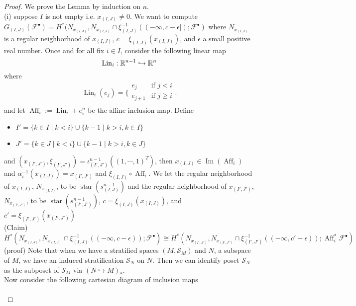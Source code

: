 \begin{proof}
We prove the Lemma by induction on $n$.\\
(i) suppose $I$ is not empty i.e. $x_{(I,J)} \neq 0$. We want to compute $G_{(I,J)}(\mathscr{F}^\bullet) = H^*(N_{x_{(I,J)}}, N_{x_{(I,J)}} \cap \xi_{(I,J)}^{-1}((-\infty,c-\epsilon]); \mathscr{F}^\bullet)$ where $N_{x_{(I,J)}}$ is a regular neighborhood of $x_{(I,J)}$, $c = \xi_{(I,J)}(x_{(I,J)})$, and $\epsilon$ a small positive real number. Once and for all fix $i\in I$, consider the following linear map
\[
\operatorname{Lin}_i : \mathbb{R}^{n-1} \hookrightarrow \mathbb{R}^n
\]
where
\[\operatorname{Lin}_i(e_j)=\bigg\{
\begin{array}{ll}
    e_j & \text{if } j < i \\
	e_{j+1} & \text{if } j \geq i \\
\end{array}
\bigg.
\] 
and let $\operatorname{Aff}_i := \operatorname{Lin}_i + e^n_i$ be the affine inclusion map. Define 
\begin{itemize}
\item $I' = \{k\in I \mid k<i\} \cup \{k-1 \mid k>i, k\in I\}$
\item $J' = \{k\in J \mid k<i\} \cup \{k-1 \mid k>i, k\in J\}$
\end{itemize}
and $(x_{(I',J')}, \xi_{(I',J')}) = \iota^{n-1}_{(I',J')}((1,\cdots,1)^T)$, then $x_{(I,J)} \in \operatorname{Im}(\operatorname{Aff}_i)$ and $\alpha_i^{-1}(x_{(I,J)})=x_{(I',J')} $ and $\xi_{(I,J)} \circ \operatorname{Aff}_i$. We let the regular neighborhood of $x_{(I,J)}$, $N_{x_{(I,J)}}$, to be $\operatorname{star}(s^{n-1}_{(I,J)})$ and the regular neighborhood of $x_{(I',J')}$, $N_{x_{(I',J')}}$, to be $\operatorname{star}(s^{n-1}_{(I',J')})$, $c = \xi_{(I,J)}(x_{(I,J)})$, and $c' = \xi_{(I',J')}(x_{(I',J')})$\\
(Claim) $H^*(N_{x_{(I,J)}}, N_{x_{(I,J)}}\cap \xi_{(I,J)}^{-1}((-\infty, c-\epsilon)); \mathscr{F}^\bullet) \cong H^*(N_{x_{(I',J')}}, N_{x_{(I',J')}}\cap \xi_{(I',J')}^{-1}((-\infty, c'-\epsilon)); \operatorname{Aff}_i^*\mathscr{F}^\bullet)$\\
(proof) Note that when we have a stratified spaces $(M,\mathcal{S}_M)$ and $N$, a subspace of $M$, we have an induced stratification $\mathcal{S}_N$ on $N$. Then we can identify poset $\mathcal{S}_N$ as the subposet of $\mathcal{S}_M$ via $(N\hookrightarrow M)_*$.\\
Now consider the following cartesian diagram of inclusion maps
\[
\begin{tikzcd}

\end{tikzcd}\]
\end{proof}
